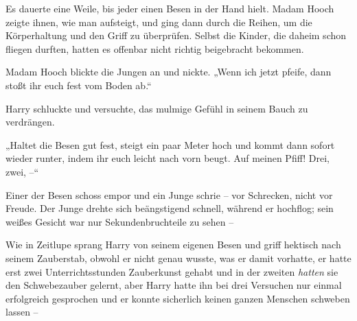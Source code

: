 Es dauerte eine Weile, bis jeder einen Besen in der Hand hielt. Madam Hooch zeigte ihnen, wie man aufsteigt, und ging dann durch die Reihen, um die Körperhaltung und den Griff zu überprüfen. Selbst die Kinder, die daheim schon fliegen durften, hatten es offenbar nicht richtig beigebracht bekommen.

Madam Hooch blickte die Jungen an und nickte. „Wenn ich jetzt pfeife, dann stoßt ihr euch fest vom Boden ab.“

Harry schluckte und versuchte, das mulmige Gefühl in seinem Bauch zu verdrängen.

„Haltet die Besen gut fest, steigt ein paar Meter hoch und kommt dann sofort wieder runter, indem ihr euch leicht nach vorn beugt. Auf meinen Pfiff! Drei, zwei, –“

Einer der Besen schoss empor und ein Junge schrie – vor Schrecken, nicht vor Freude. Der Junge drehte sich beängstigend schnell, während er hochflog; sein weißes Gesicht war nur Sekundenbruchteile zu sehen –

Wie in Zeitlupe sprang Harry von seinem eigenen Besen und griff hektisch nach seinem Zauberstab, obwohl er nicht genau wusste, was er damit vorhatte, er hatte erst zwei Unterrichtsstunden Zauberkunst gehabt und in der zweiten \emph{hatten} sie den Schwebezauber gelernt, aber Harry hatte ihn bei drei Versuchen nur einmal erfolgreich gesprochen und er konnte sicherlich keinen ganzen Menschen schweben lassen –

